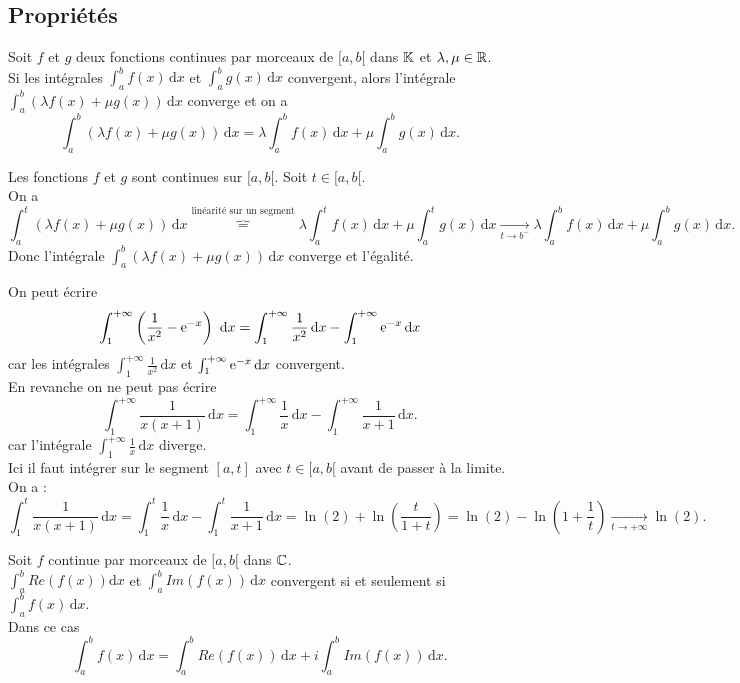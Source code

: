 \documentclass{book}
\begin{document}
\subsection{Propriétés}
\begin{Proposition}[Linéarité]
Soit $f$ et $g$ deux fonctions continues par morceaux de $[a,b[$ dans $\mathbb{K}$ et $\lambda,\mu\in\mathbb{R}$.\\
 Si les intégrales $\int_a^b f(x)\,\mathrm dx$ et $\int_a^b g(x)\,\mathrm dx$ convergent, alors l'intégrale $\int_a^b (\lambda f(x) +\mu g(x))\,\mathrm dx$ converge et on a
 $$\int_a^b (\lambda f(x) +\mu g(x))\,\mathrm dx=\lambda \int_a^b f(x)\,\mathrm dx +\mu \int_a^b g(x)\,\mathrm dx.$$
\end{Proposition}
\begin{Demonstration}
Les fonctions $f$ et $g$ sont continues sur $[a,b[$. Soit $t\in [a,b[$.\\
On a $$\int_a^t (\lambda f(x) +\mu g(x))\,\mathrm dx\overbrace{=}^{\text{linéarité sur un segment}}\lambda \int_a^t f(x)\,\mathrm dx +\mu \int_a^t g(x)\,\mathrm dx\xrightarrow[t\to b^-]{}\lambda \int_a^b f(x)\,\mathrm dx +\mu \int_a^b g(x)\,\mathrm dx.$$
Donc l'intégrale $\int_a^b (\lambda f(x) +\mu g(x))\,\mathrm dx$ converge et l'égalité.
\end{Demonstration}
\begin{Exemple}
On peut écrire
$$ \int _{1}^{+\infty }\left({\frac {1}{x^{2}}}-{\rm {e}}^{-x}\right)\,\,\mathrm {d} x=\int _{1}^{+\infty }{\frac {1}{x^{2}}}\,\mathrm {d} x-\int _{1}^{+\infty }{\rm {e}}^{-x}\,\mathrm {d} x$$
car les intégrales $\int _{1}^{+\infty }{\frac {1}{x^{2}}}\,\mathrm {d} x $ et  $\int _{1}^{+\infty }{\rm {e}}^{-x}\,\mathrm {d} x$  convergent.\\
En revanche on ne peut pas écrire
$$ \int _{1}^{+\infty }{\frac {1}{x(x+1)}}\,\mathrm {d} x=\int _{1}^{+\infty }\frac {1}{x}\,\mathrm {d} x-\int _{1}^{+\infty }\frac {1}{x+1}\,\mathrm {d} x.$$
car l'intégrale $\int _{1}^{+\infty }\frac {1}{x}\,\mathrm {d} x$ diverge. \\
Ici il faut intégrer sur le segment $[a, t ]$ avec $t\in [a,b [$ avant de passer à la limite. On a :
$$ \int _{1}^{t }{\frac {1}{x(x+1)}}\,\mathrm {d} x=\int _{1}^{t }\frac {1}{x}\,\mathrm {d} x-\int _{1}^{t }\frac {1}{x+1}\,\mathrm {d} x=\ln(2)+\ln\left(\frac{t}{1+t}\right)=\ln(2)-\ln\left(1+\frac 1 t\right)\xrightarrow[t\to +\infty]{}\ln(2).$$
\end{Exemple}
\begin{Corollaire}
Soit $f$  continue par morceaux de $[a,b[$ dans $\mathbb{C}$.\\
$\int_a^b Re(f(x))\mathrm dx$  et $\int_a^b Im(f(x))\,\mathrm dx$ convergent si et seulement si $\int_a^b f(x)\,\mathrm dx$.\\
Dans ce cas 
$$ \int_a^b f(x)\,\mathrm dx = \int_a^b Re(f(x))\,\mathrm dx+ i \int_a^b Im(f(x))\,\mathrm dx.$$
\end{Corollaire}
\end{document}
